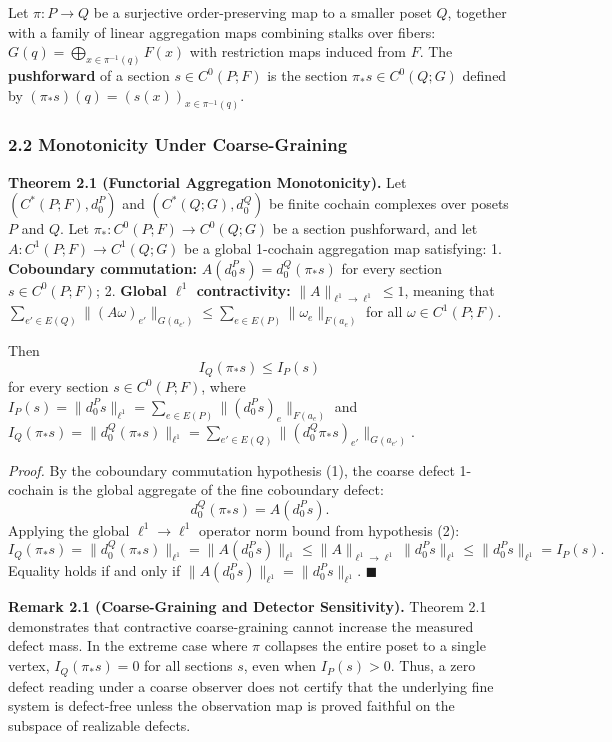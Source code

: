\documentclass[
]{article}
\begin{document}
Let \(\pi: P \to Q\) be a surjective order-preserving map to a smaller poset \(Q\), together with a family of linear aggregation maps combining stalks over fibers: \(G(q) = \bigoplus_{x \in \pi^{-1}(q)} F(x)\) with restriction maps induced from \(F\). The \textbf{pushforward} of a section \(s \in C^0(P; F)\) is the section \(\pi_* s \in C^0(Q; G)\) defined by \((\pi_* s)(q) = (s(x))_{x \in \pi^{-1}(q)}\).

\subsubsection{2.2 Monotonicity Under Coarse-Graining}\label{monotonicity-under-coarse-graining}

\textbf{Theorem 2.1 (Functorial Aggregation Monotonicity).} Let \((C^*(P; F), d_0^P)\) and \((C^*(Q; G), d_0^Q)\) be finite cochain complexes over posets \(P\) and \(Q\). Let \(\pi_*: C^0(P; F) \to C^0(Q; G)\) be a section pushforward, and let \(A: C^1(P; F) \to C^1(Q; G)\) be a global 1-cochain aggregation map satisfying:
1. \textbf{Coboundary commutation:} \(A(d_0^P s) = d_0^Q(\pi_* s)\) for every section \(s \in C^0(P; F)\);
2. \textbf{Global \(\ell^1\) contractivity:} \(\|A\|_{\ell^1 \to \ell^1} \le 1\), meaning that \(\sum_{e' \in E(Q)} \|(A \omega)_{e'}\|_{G(a_{e'})} \le \sum_{e \in E(P)} \|\omega_e\|_{F(a_e)}\) for all \(\omega \in C^1(P; F)\).

Then
\[I_Q(\pi_* s) \le I_P(s)\]
for every section \(s \in C^0(P; F)\), where \(I_P(s) = \|d_0^P s\|_{\ell^1} = \sum_{e \in E(P)} \|(d_0^P s)_e\|_{F(a_e)}\) and \(I_Q(\pi_* s) = \|d_0^Q(\pi_* s)\|_{\ell^1} = \sum_{e' \in E(Q)} \|(d_0^Q \pi_* s)_{e'}\|_{G(a_{e'})}\).

\emph{Proof.} By the coboundary commutation hypothesis (1), the coarse defect 1-cochain is the global aggregate of the fine coboundary defect:
\[d_0^Q(\pi_* s) = A(d_0^P s).\]
Applying the global \(\ell^1 \to \ell^1\) operator norm bound from hypothesis (2):
\[I_Q(\pi_* s) = \|d_0^Q(\pi_* s)\|_{\ell^1} = \|A(d_0^P s)\|_{\ell^1} \le \|A\|_{\ell^1 \to \ell^1} \|d_0^P s\|_{\ell^1} \le \|d_0^P s\|_{\ell^1} = I_P(s).\]
Equality holds if and only if \(\|A(d_0^P s)\|_{\ell^1} = \|d_0^P s\|_{\ell^1}\). \(\blacksquare\)

\textbf{Remark 2.1 (Coarse-Graining and Detector Sensitivity).} Theorem 2.1 demonstrates that contractive coarse-graining cannot increase the measured defect mass. In the extreme case where \(\pi\) collapses the entire poset to a single vertex, \(I_Q(\pi_* s) = 0\) for all sections \(s\), even when \(I_P(s) > 0\). Thus, a zero defect reading under a coarse observer does not certify that the underlying fine system is defect-free unless the observation map is proved faithful on the subspace of realizable defects.
\end{document}
